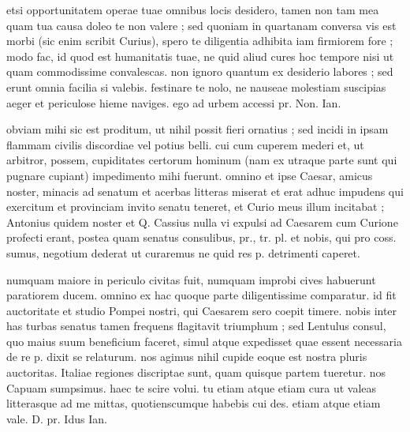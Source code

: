 


 etsi opportunitatem operae tuae omnibus locis desidero, tamen non tam mea quam tua causa doleo te non valere ; sed quoniam in quartanam conversa vis est morbi (sic enim scribit Curius), spero te diligentia adhibita iam firmiorem fore ; modo fac, id quod est humanitatis tuae, ne quid aliud cures hoc tempore nisi ut quam commodissime convalescas. non ignoro quantum ex desiderio labores ; sed erunt omnia facilia si valebis. festinare te nolo, ne nauseae molestiam suscipias aeger et periculose hieme naviges. ego ad urbem accessi pr. Non. Ian.

 obviam mihi sic est proditum, ut nihil possit fieri ornatius ; sed incidi in ipsam flammam civilis discordiae vel potius belli. cui cum cuperem mederi et, ut arbitror, possem, cupiditates certorum hominum (nam ex utraque parte sunt qui pugnare cupiant) impedimento mihi fuerunt. omnino et ipse Caesar, amicus noster, minacis ad senatum et acerbas litteras miserat et erat adhuc impudens qui exercitum et provinciam invito senatu teneret, et Curio meus illum incitabat ; Antonius quidem noster et Q. Cassius nulla vi expulsi ad Caesarem cum Curione profecti erant, postea quam senatus consulibus, pr., tr. pl. et nobis, qui pro coss. sumus, negotium dederat ut curaremus ne quid res p. detrimenti caperet.

 numquam maiore in periculo civitas fuit, numquam improbi cives habuerunt paratiorem ducem. omnino ex hac quoque parte diligentissime comparatur. id fit auctoritate et studio Pompei nostri, qui Caesarem sero coepit timere. nobis inter has turbas senatus tamen frequens flagitavit triumphum ; sed Lentulus consul, quo maius suum beneficium faceret, simul atque expedisset quae essent necessaria de re p. dixit se relaturum. nos agimus nihil cupide eoque est nostra pluris auctoritas. Italiae regiones discriptae sunt, quam quisque partem tueretur. nos Capuam sumpsimus. haec te scire volui. tu etiam atque etiam cura ut valeas litterasque ad me mittas, quotienscumque habebis cui des. etiam atque etiam vale. D. pr. Idus Ian.
